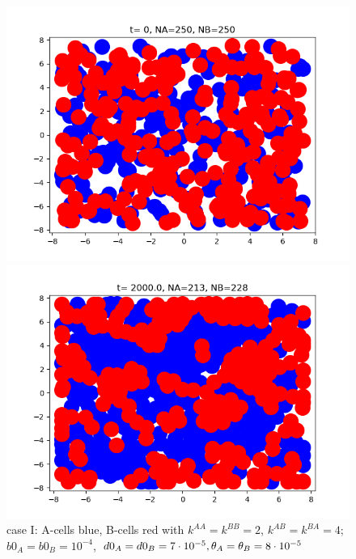 \begin{figure}[htb]
	\begin{minipage}[t]{.45\textwidth}
		\centering
		\includegraphics[width=\textwidth]{micro_caseI_ini4}
	\end{minipage}
	\hfill
	\begin{minipage}[t]{.45\textwidth}
		\centering
		\includegraphics[width=\textwidth]{micro_caseI_fin4}
	\end{minipage}  
	\caption{{case I: A-cells blue, B-cells red with $k^{AA}=k^{BB}=2 $, $k^{AB}=k^{BA}=4$; $b0_A=b0_B=10^{-4}$, $d0_A=d0_B=7\cdot10^{-5}, {\theta}_A={\theta}_B=8\cdot 10^{-5}$}	}
\end{figure}


